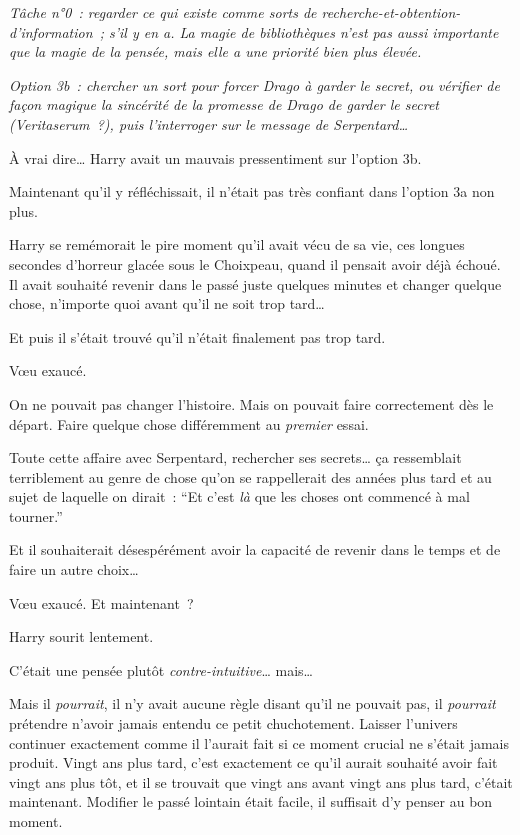 \emph{Tâche n°0~: regarder ce qui existe comme sorts de recherche-et-obtention-d'information~; s'il y en a.
La magie de bibliothèques n'est pas aussi importante que la magie de la pensée, mais elle a une priorité bien plus élevée.}

\emph{Option 3b~: chercher un sort pour forcer Drago à garder le secret, ou vérifier de façon magique la sincérité de la promesse de Drago de garder le secret (Veritaserum~?), puis l'interroger sur le message de Serpentard…}

À vrai dire… Harry avait un mauvais pressentiment sur l'option 3b.

Maintenant qu'il y réfléchissait, il n'était pas très confiant dans l'option 3a non plus.

Harry se remémorait le pire moment qu'il avait vécu de sa vie, ces longues secondes d'horreur glacée sous le Choixpeau, quand il pensait avoir déjà échoué.
Il avait souhaité revenir dans le passé juste quelques minutes et changer quelque chose, n'importe quoi avant qu'il ne soit trop tard…

Et puis il s'était trouvé qu'il n'était finalement pas trop tard.

Vœu exaucé.

On ne pouvait pas changer l'histoire.
Mais on pouvait faire correctement dès le départ.
Faire quelque chose différemment au \emph{premier} essai.

Toute cette affaire avec Serpentard, rechercher ses secrets… ça ressemblait terriblement au genre de chose qu'on se rappellerait des années plus tard et au sujet de laquelle on dirait~: “Et c'est \emph{là} que les choses ont commencé à mal tourner.”

Et il souhaiterait désespérément avoir la capacité de revenir dans le temps et de faire un autre choix…

Vœu exaucé. Et maintenant~?

Harry sourit lentement.

C'était une pensée plutôt \emph{contre-intuitive}… mais…

Mais il \emph{pourrait}, il n'y avait aucune règle disant qu'il ne pouvait pas, il \emph{pourrait} prétendre n'avoir jamais entendu ce petit chuchotement.
Laisser l'univers continuer exactement comme il l'aurait fait si ce moment crucial ne s'était jamais produit.
Vingt ans plus tard, c'est exactement ce qu'il aurait souhaité avoir fait vingt ans plus tôt, et il se trouvait que vingt ans avant vingt ans plus tard, c'était maintenant.
Modifier le passé lointain était facile, il suffisait d'y penser au bon moment.

